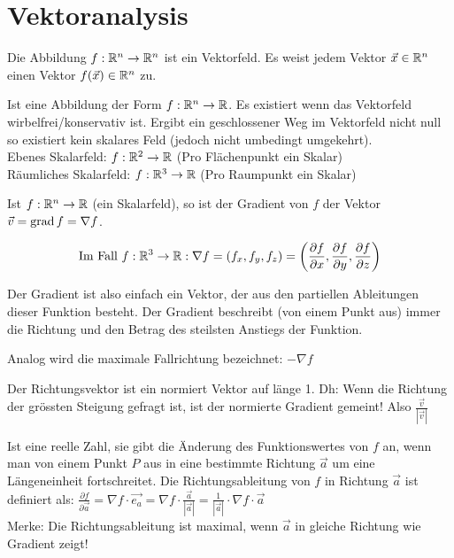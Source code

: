 \section{Vektoranalysis}
\begin{definition}[Vektorfeld]
Die Abbildung $f: \mathbb{R}^n \to \mathbb{R}^n$ ist ein Vektorfeld. Es weist jedem
Vektor $\vec{x} \in \mathbb{R}^n$ einen Vektor $f(\vec{x}) \in \mathbb{R}^n$ zu.
\end{definition}

\begin{definition}[Skalarfeld]
Ist eine Abbildung der Form $f: \mathbb{R}^n \to \mathbb{R}$. Es existiert wenn das Vektorfeld wirbelfrei/konservativ ist. Ergibt ein geschlossener Weg im Vektorfeld nicht null so existiert kein skalares Feld (jedoch nicht umbedingt umgekehrt).\\
Ebenes Skalarfeld: $f: \mathbb{R}^2 \to \mathbb{R}$ (Pro Flächenpunkt ein Skalar)\\
Räumliches Skalarfeld: $f: \mathbb{R}^3 \to \mathbb{R}$ (Pro Raumpunkt ein Skalar)
\end{definition}

\begin{definition}[Gradient]
Ist $f: \mathbb{R}^n \to \mathbb{R}$ (ein Skalarfeld), so ist der Gradient von $f$ der Vektor
$\vec{v} = \operatorname{grad} f = \nabla f$. 

\[
	\text{Im Fall } f: \mathbb{R}^3 \to \mathbb{R}:   \nabla f = (f_x, f_y, f_z) =
	\left( \frac{\partial f}{\partial x}, \frac{\partial f}{\partial y}, \frac{\partial f}{\partial z} \right)
\]

Der Gradient ist also einfach ein Vektor, der aus den partiellen Ableitungen dieser Funktion besteht. Der Gradient beschreibt (von einem Punkt aus) immer die Richtung und den Betrag des steilsten Anstiegs der Funktion. 

Analog wird die maximale Fallrichtung bezeichnet: $- \nabla f$
\end{definition}

\begin{definition}[Richtungsvektor] Der Richtungsvektor ist ein normiert Vektor auf länge 1. Dh: Wenn die Richtung der grössten Steigung gefragt ist, ist der normierte Gradient gemeint! Also $\frac{\vec{v}}{|\vec{v}|}$
\end{definition}

\begin{definition}[Richtungsableitung]
Ist eine reelle Zahl, sie gibt die Änderung des Funktionswertes von $f$ an, wenn man von einem Punkt $P$ aus in eine bestimmte Richtung $\vec{a}$ um eine Längeneinheit fortschreitet. Die Richtungsableitung von $f$ in Richtung $\vec{a}$ ist definiert als: 
$\frac{\partial f}{\partial \vec{a}} = \nabla f \cdot \vec{e_a} = \nabla f \cdot \frac{\vec{a}}{|\vec{a}|} = \frac{1}{|\vec{a}|} \cdot \nabla f \cdot \vec{a}$\\
Merke: Die Richtungsableitung ist maximal, wenn $\vec{a}$ in gleiche Richtung wie Gradient zeigt!
\end{definition}

